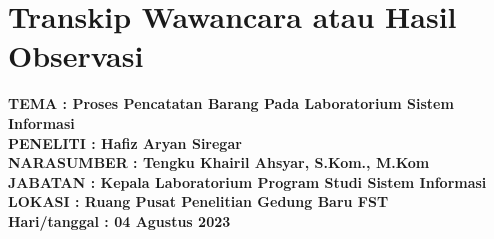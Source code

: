 %


%


\renewcommand{\thepage}{B - \arabic{page}}
\chapter{Transkip Wawancara atau Hasil Observasi}
\begin{flushleft}

	\textbf{TEMA : Proses Pencatatan Barang Pada Laboratorium Sistem Informasi} \\
	\textbf{PENELITI : Hafiz Aryan Siregar} \\
	\textbf{NARASUMBER : Tengku Khairil Ahsyar, S.Kom., M.Kom} \\
	\textbf{JABATAN : Kepala Laboratorium Program Studi Sistem Informasi} \\
	\textbf{LOKASI : Ruang Pusat Penelitian Gedung Baru FST} \\
	\textbf{Hari/tanggal : 04 Agustus 2023}
\end{flushleft}


